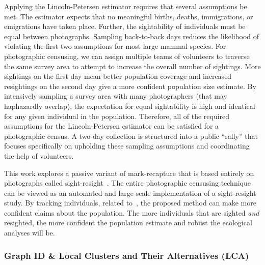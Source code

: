 Applying the Lincoln-Petersen estimator requires that several assumptions be met.  The estimator expects that no meaningful births, deaths, immigrations, or emigrations have taken place.  Further, the sightability of individuals must be equal between photographs.  Sampling back-to-back days reduces the likelihood of violating the first two assumptions for most large mammal species.  For photographic censusing, we can assign multiple teams of volunteers to traverse the same survey area to attempt to increase the overall number of sightings.  More sightings on the first day mean better population coverage and increased resightings on the second day give a more confident population size estimate.  By intensively sampling a survey area with many photographers (that may haphazardly overlap), the expectation for equal sightability is high and identical for any given individual in the population.  Therefore, all of the required assumptions for the Lincoln-Petersen estimator can be satisfied for a photographic census.  A two-day collection is structured into a public ``rally'' that focuses specifically on upholding these sampling assumptions and coordinating the help of volunteers.

This work explores a passive variant of mark-recapture that is based entirely on photographs called sight-resight~\cite{bolger_computer-assisted_2012,hiby_analysis_2013}.  The entire photographic censusing technique can be viewed as an automated and large-scale implementation of a sight-resight study.  By tracking individuals, related to~\cite{jolly_explicit_1965,seber_note_1965}, the proposed method can make more confident claims about the population.  The more individuals that are sighted \textit{and} resighted, the more confident the population estimate and robust the ecological analyses will be.

\subsubsection{Graph ID \& Local Clusters and Their Alternatives (LCA)}

